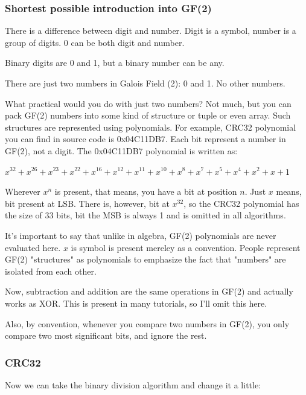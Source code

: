 

\subsubsection{Shortest possible introduction into GF(2)}

There is a difference between digit and number.
Digit is a symbol, number is a group of digits.
0 can be both digit and number.

Binary digits are 0 and 1, but a binary number can be any.

There are just two numbers in Galois Field (2): 0 and 1.
No other numbers.

What practical would you do with just two numbers?
Not much, but you can pack GF(2) numbers into some kind of structure or tuple or even array.
Such structures are represented using polynomials.
For example, CRC32 polynomial you can find in source code is 0x04C11DB7.
Each bit represent a number in GF(2), not a digit.
The 0x04C11DB7 polynomial is written as: 

$x^{32} + x^{26} + x^{23} + x^{22} + x^{16} + x^{12} + x^{11} + x^{10} + x^8 + x^7 + x^5 + x^4 + x^2 + x + 1$

Wherever $x^n$ is present, that means, you have a bit at position $n$.
Just $x$ means, bit present at LSB.
There is, however, bit at $x^{32}$, so the CRC32 polynomial has the size of 33 bits, bit the MSB is always 1 and is
omitted in all algorithms.

It's important to say that unlike in algebra, GF(2) polynomials are never evaluated here.
$x$ is symbol is present mereley as a convention.
People represent GF(2) "structures" as polynomials to emphasize the fact that "numbers" are isolated from each other.

Now, subtraction and addition are the same operations in GF(2) and actually works as XOR.
This is present in many tutorials, so I'll omit this here.

Also, by convention, whenever you compare two numbers in GF(2), you only compare two most significant bits,
and ignore the rest.

\subsubsection{CRC32}

Now we can take the binary division algorithm and change it a little:

